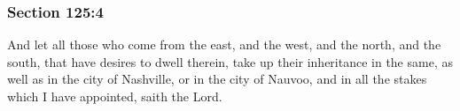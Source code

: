 
	\subsubsection{Section 125:4} %
		\label{DC125-4}

		And let all those who come from the east, and the west, and the north, and the south, that have desires to dwell therein, take up their inheritance in the same, as well as in the city of Nashville, or in the city of Nauvoo, and in all the stakes which I have appointed, saith the Lord.


